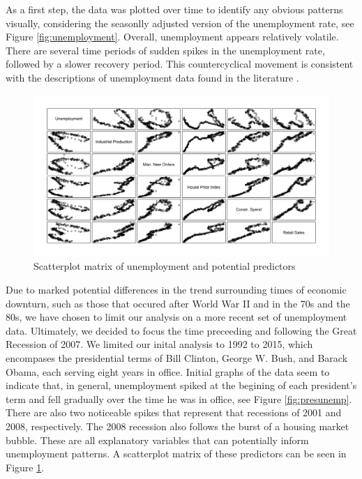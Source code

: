 \documentclass[twoside,twocolumn]{article}
\begin{document}
As a first step, the data was plotted over time to identify any obvious patterns visually, considering the seasonlly adjusted version of the unemployment rate, see Figure \ref{fig:unemployment}.  Overall, unemployment appears relatively volatile.  There are several time periods of sudden spikes in the unemployment rate, followed by a slower recovery period. This countercyclical movement is consistent with the descriptions of unemployment data found in the literature \citep{katz2010, Montgomery1998, shimer2012reassessing}. 
	
		\begin{figure}[htb]
		\caption{Scatterplot matrix of unemployment and potential predictors}
		\label{fig:pred_scatt}
		\includegraphics[width=\linewidth]{images/pred_scatt}
	\end{figure}

Due to marked potential differences in the trend surrounding times of economic downturn, such as those that occured after World War II and in the 70s and the 80s, we have chosen to limit our analysis on a more recent set of unemployment data. Ultimately, we decided to focus the time preceeding and following the Great Recession of 2007. We limited our inital analysis to 1992 to 2015, which encompases the presidential terms of Bill Clinton, George W. Bush, and Barack Obama, each serving eight years in office.  Initial graphs of the data seem to indicate that, in general, unemployment spiked at the begining of each president's term and fell gradually over the time he was in office, see Figure \ref{fig:presunemp}. There are also two noticeable spikes that represent that recessions of 2001 and 2008, respectively.  The 2008 recession also follows the burst of a housing market bubble.  These are all explanatory variables that can potentially inform unemployment patterns. A scatterplot matrix  of these predictors can be seen in Figure \ref{fig:pred_scatt}.
\end{document}
